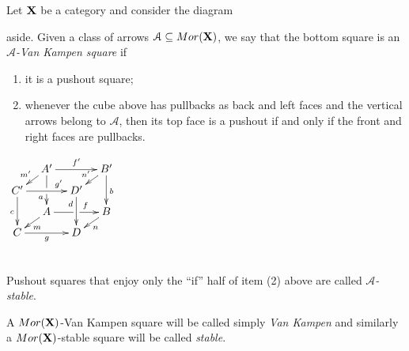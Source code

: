 \documentclass[a4paper,UKenglish,cleveref,pdftex,thm-restate,numberwithinsect]{lipics-v2021}
\newcommand{\mor}{\mathsf{Mor}}
\def\C{\textbf {\textup{C}}}
\def\X{\textbf {\textup{X}}}
\begin{document}


  \begin{definition}
    Let $\X$ be a category and consider
    the diagram\\
    \parbox{10cm}{
      aside.
    Given  a class of arrows $\mathcal{A}\subseteq \mor(\X)$, we say that the bottom square
    is an \emph{$\mathcal{A}$-Van Kampen square} if
      \begin{enumerate}
      \item it is a pushout square;
    \item 	whenever the cube above has pullbacks as back and left faces and the vertical arrows belong to $\mathcal{A}$, then its top face is a pushout 
      if and only if the front and right faces are pullbacks.
      \end{enumerate}}
    \parbox{2cm}{$\xymatrix@C=10pt@R=6pt{&A'\ar[dd]|\hole_(.65){a}\ar[rr]^{f'} \ar[dl]_{m'} && B' \ar[dd]^{b} \ar[dl]_{n'} \\ C'  \ar[dd]_{c}\ar[rr]^(.7){g'} & & D' \ar[dd]_(.3){d}\\&A\ar[rr]|\hole^(.65){f} \ar[dl]^{m} && B \ar[dl]^{n} \\C \ar[rr]_{g} & & D }$ }\\
    Pushout squares that enjoy only the ``if'' half of item (2) above are called \emph{$\mathcal{A}$-stable}.
    
    A $\mor(\X)$-Van Kampen square will be called simply \emph{Van
      Kampen} and similarly a $\mor(\X)$-stable square will be called
    \emph{stable}.
  \end{definition}

    
\end{document}
